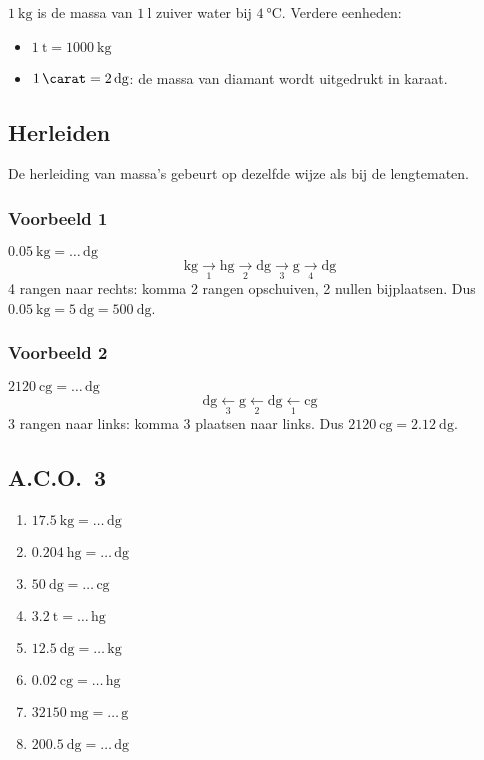\documentclass[a4paper,12pt]{article}
\begin{document}
\noindent\(\SI{1}{\kilo\gram}\) is de massa van \(\SI{1}{\litre}\) zuiver water bij \(\SI{4}{\celsius}\). Verdere eenheden:
\begin{itemize}
  \item \(\SI{1}{\tonne}=\SI{1000}{\kilo\gram}\)
  \item \(\SI{1}{\carat}=\SI{2}{\deci\gram}\): de massa van diamant wordt uitgedrukt in karaat.
\end{itemize}

\subsection{Herleiden}
De herleiding van massa's gebeurt op dezelfde wijze als bij de lengtematen.

\subsubsection*{Voorbeeld 1}
\(\SI{0.05}{\kilo\gram}=\ldots\,\si{\deci\gram}\)
\[
\si{\kilo\gram}\xrightarrow[1]{}\si{\hecto\gram}\xrightarrow[2]{}\si{\deca\gram}\xrightarrow[3]{}\si{\gram}\xrightarrow[4]{}\si{\deci\gram}
\]
4 rangen naar rechts: komma 2 rangen opschuiven, 2 nullen bijplaatsen. Dus \(\SI{0.05}{\kilo\gram}=\SI{5}{\deca\gram}=\SI{500}{\deci\gram}\).

\subsubsection*{Voorbeeld 2}
\(\SI{2120}{\centi\gram}=\ldots\,\si{\deca\gram}\)
\[
\si{\deca\gram}\xleftarrow[3]{}\si{\gram}\xleftarrow[2]{}\si{\deci\gram}\xleftarrow[1]{}\si{\centi\gram}
\]
3 rangen naar links: komma 3 plaatsen naar links. Dus \(\SI{2120}{\centi\gram}=\SI{2.12}{\deca\gram}\).

\subsection*{A.C.O.~3}
\begin{multicols}{2}
  \begin{enumerate}
  \item \(\SI{17.5}{\kilo\gram}=\ldots\,\si{\deca\gram}\)
  \item \(\SI{0.204}{\hecto\gram}=\ldots\,\si{\deci\gram}\)
  \item \(\SI{50}{\deca\gram}=\ldots\,\si{\centi\gram}\)
  \item \(\SI{3.2}{\tonne}=\ldots\,\si{\hecto\gram}\)
  \item \(\SI{12.5}{\deca\gram}=\ldots\,\si{\kilo\gram}\)
  \item \(\SI{0.02}{\centi\gram}=\ldots\,\si{\hecto\gram}\)
  \item \(\SI{32150}{\milli\gram}=\ldots\,\si{\gram}\)
  \item \(\SI{200.5}{\deci\gram}=\ldots\,\si{\deca\gram}\)
  \end{enumerate}
\end{multicols}
\end{document}
